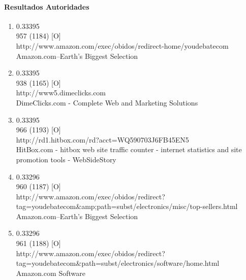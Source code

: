 \paragraph{Resultados Autoridades}
\begin{enumerate}
\item
0.33395\\
957 (1184) [O]\\
http://www.amazon.com/exec/obidos/redirect-home/youdebatecom\\
Amazon.com--Earth's Biggest Selection\\

\item
0.33395\\
938 (1165) [O]\\
http://www5.dimeclicks.com\\
DimeClicks.com - Complete Web and Marketing Solutions\\

\item
0.33395\\
966 (1193) [O]\\
http://rd1.hitbox.com/rd?acct=WQ590703J6FB45EN5\\
HitBox.com - hitbox web site traffic counter - internet statistics and site promotion tools - WebSideStory\\

\item
0.33296\\
960 (1187) [O]\\
http://www.amazon.com/exec/obidos/redirect?tag=youdebatecom\&amp;path=subst/electronics/misc/top-sellers.html\\
Amazon.com--Earth's Biggest Selection\\

\item
0.33296\\
961 (1188) [O]\\
http://www.amazon.com/exec/obidos/redirect?tag=youdebatecom\&path=subst/electronics/software/home.html\\
Amazon.com Software\\

\end{enumerate}


